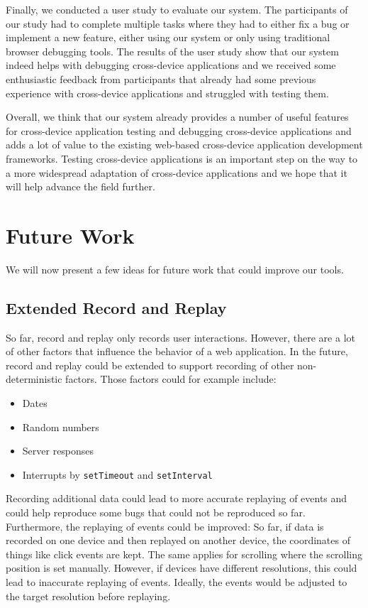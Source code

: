 Finally, we conducted a user study to evaluate our system. The participants of our study had to complete multiple tasks where they had to either fix a bug or implement a new feature, either using our system or only using traditional browser debugging tools. The results of the user study show that our system indeed helps with debugging cross-device applications and we received some enthusiastic feedback from participants that already had some previous experience with cross-device applications and struggled with testing them. 

Overall, we think that our system already provides a number of useful features for cross-device application testing and debugging cross-device applications and adds a lot of value to the existing web-based cross-device application development frameworks. Testing cross-device applications is an important step on the way to a more widespread adaptation of cross-device applications and we hope that it will help advance the field further.

\section{Future Work}

We will now present a few ideas for future work that could improve our tools.

\subsection{Extended Record and Replay}

So far, record and replay only records user interactions. However, there are a lot of other factors that influence the behavior of a web application. In the future, record and replay could be extended to support recording of other non-deterministic factors. Those factors could for example include:
\begin{itemize}
	\item Dates
	\item Random numbers
	\item Server responses
	\item Interrupts by \lstinline|setTimeout| and \lstinline|setInterval|
\end{itemize}
Recording additional data could lead to more accurate replaying of events and could help reproduce some bugs that could not be reproduced so far. Furthermore, the replaying of events could be improved: So far, if data is recorded on one device and then replayed on another device, the coordinates of things like click events are kept. The same applies for scrolling where the scrolling position is set manually. However, if devices have different resolutions, this could lead to inaccurate replaying of events. Ideally, the events would be adjusted to the target resolution before replaying.

